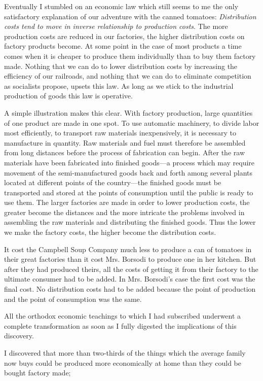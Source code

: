 \documentclass{book}
\begin{document}
Eventually I stumbled on an economic law which still seems to me the only satisfactory explanation of our adventure with the canned tomatoes: \emph{Distribution costs tend to move in inverse relationship to production costs}. The more production costs are reduced in our factories, the higher distribution costs on factory products become. At some point in the case of most products a time comes when it is cheaper to produce them individually than to buy them factory made. Nothing that we can do to lower distribution costs by increasing the efficiency of our railroads, and nothing that we can do to eliminate competition as socialists propose, upsets this law. As long as we stick to the industrial production of goods this law is operative.

A simple illustration makes this clear. With factory production, large quantities of one product are made in one spot. To use automatic machinery, to divide labor most efficiently, to transport raw materials inexpensively, it is necessary to manufacture in quantity. Raw materials and fuel must therefore be assembled from long distances before the process of fabrication can begin. After the raw materials have been fabricated into finished goods—a process which may require movement of the semi-manufactured goods back and forth among several plants located at different points of the country—the finished goods must be transported and stored at the points of consumption until the public is ready to use them. The larger factories are made in order to lower production costs, the greater become the distances and the more intricate the problems involved in assembling the raw materials and distributing the finished goods. Thus the lower we make the factory costs, the higher become the distribution costs.

It cost the Campbell Soup Company much less to produce a can of tomatoes in their great factories than it cost Mrs. Borsodi to produce one in her kitchen. But after they had produced theirs, all the costs of getting it from their factory to the ultimate consumer had to be added. In Mrs. Borsodi’s case the first cost was the final cost. No distribution costs had to be added because the point of production and the point of consumption was the same.

All the orthodox economic teachings to which I had subscribed underwent a complete transformation as soon as I fully digested the implications of this discovery.

I discovered that more than two-thirds of the things which the average family now buys could be produced more economically at home than they could be bought factory made;
\end{document}
